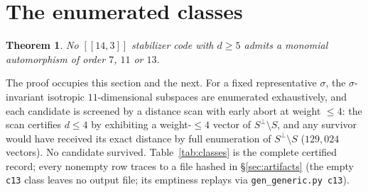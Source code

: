 \documentclass[11pt]{amsart}
\newcommand{\Sperp}{S^{\perp}}
\theoremstyle{plain}
\newtheorem{theorem}{Theorem}[section]
\theoremstyle{definition}
\theoremstyle{remark}
\begin{document}
\section{The enumerated classes}\label{sec:enum}

\begin{theorem}\label{thm:main}
No $[[14,3]]$ stabilizer code with $d\ge5$ admits a monomial automorphism
of order $7$, $11$ or $13$.
\end{theorem}

The proof occupies this section and the next. For a fixed representative
$\sigma$, the $\sigma$-invariant isotropic $11$-dimensional subspaces are
enumerated exhaustively, and each candidate is screened by a distance
scan with early abort at weight $\le4$: the scan certifies $d\le4$ by
exhibiting a weight-$\le4$ vector of $\Sperp\setminus S$, and any
survivor would have received its exact distance by full enumeration of
$\Sperp\setminus S$ ($129{,}024$ vectors). No candidate survived.
Table~\ref{tab:classes} is the complete certified record; every nonempty
row traces to a file hashed in \S\ref{sec:artifacts} (the empty
\texttt{c13} class leaves no output file; its emptiness replays via
\texttt{gen\_generic.py c13}).
\end{document}
